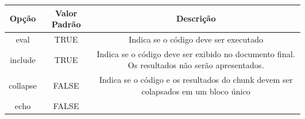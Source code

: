 \documentclass[]{book}
\begin{document}
\begin{longtable}[]{@{}ccc@{}}
\toprule
\begin{minipage}[b]{0.15\columnwidth}\centering\strut
Opção\strut
\end{minipage} & \begin{minipage}[b]{0.21\columnwidth}\centering\strut
Valor Padrão\strut
\end{minipage} & \begin{minipage}[b]{0.55\columnwidth}\centering\strut
Descrição\strut
\end{minipage}\tabularnewline
\midrule
\endhead
\begin{minipage}[t]{0.15\columnwidth}\centering\strut
eval\strut
\end{minipage} & \begin{minipage}[t]{0.21\columnwidth}\centering\strut
TRUE\strut
\end{minipage} & \begin{minipage}[t]{0.55\columnwidth}\centering\strut
Indica se o código deve ser executado\strut
\end{minipage}\tabularnewline
\begin{minipage}[t]{0.15\columnwidth}\centering\strut
include\strut
\end{minipage} & \begin{minipage}[t]{0.21\columnwidth}\centering\strut
TRUE\strut
\end{minipage} & \begin{minipage}[t]{0.55\columnwidth}\centering\strut
Indica se o código deve ser exibido no documento final. Os resultados
não serão apresentados.\strut
\end{minipage}\tabularnewline
\begin{minipage}[t]{0.15\columnwidth}\centering\strut
collapse\strut
\end{minipage} & \begin{minipage}[t]{0.21\columnwidth}\centering\strut
FALSE\strut
\end{minipage} & \begin{minipage}[t]{0.55\columnwidth}\centering\strut
Indica se o código e os resultados do chunk devem ser colapsados em um
bloco único\strut
\end{minipage}\tabularnewline
\begin{minipage}[t]{0.15\columnwidth}\centering\strut
echo\strut
\end{minipage} & \begin{minipage}[t]{0.21\columnwidth}\centering\strut
FALSE\strut
\end{minipage} & \begin{minipage}[t]{0.55\columnwidth}\centering\strut

\end{minipage}
\end{longtable}
\end{document}
